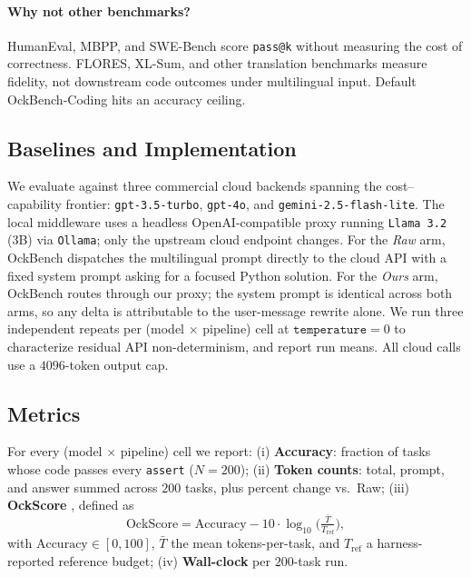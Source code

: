 \documentclass[11pt,a4paper,twocolumn]{article}
\begin{document}
\paragraph{Why not other benchmarks?} HumanEval, MBPP, and SWE-Bench \cite{jimenez2024swebench} score \texttt{pass@k} without measuring the cost of correctness. FLORES, XL-Sum, and other translation benchmarks measure fidelity, not downstream code outcomes under multilingual input. Default OckBench-Coding \cite{du2026ockbench} hits an accuracy ceiling.

\subsection{Baselines and Implementation}
We evaluate against three commercial cloud backends spanning the cost--capability frontier: \texttt{gpt-3.5-turbo}, \texttt{gpt-4o}, and \texttt{gemini-2.5-flash-lite}. The local middleware uses a headless OpenAI-compatible proxy running \texttt{Llama 3.2} (3B) via \texttt{Ollama}; only the upstream cloud endpoint changes. For the \textit{Raw} arm, OckBench dispatches the multilingual prompt directly to the cloud API with a fixed system prompt asking for a focused Python solution. For the \textit{Ours} arm, OckBench routes through our proxy; the system prompt is identical across both arms, so any delta is attributable to the user-message rewrite alone. We run three independent repeats per (model $\times$ pipeline) cell at $\texttt{temperature}=0$ to characterize residual API non-determinism, and report run means. All cloud calls use a $4096$-token output cap.

\subsection{Metrics}
\label{sec:metrics}
For every (model $\times$ pipeline) cell we report: (i) \textbf{Accuracy}: fraction of tasks whose code passes every \texttt{assert} ($N=200$); (ii) \textbf{Token counts}: total, prompt, and answer summed across $200$ tasks, plus percent change vs.\ Raw; (iii) \textbf{OckScore} \cite{du2026ockbench}, defined as
\begin{equation}
    \mathrm{OckScore} = \mathrm{Accuracy} - 10\cdot\log_{10}\!\Big(\tfrac{\bar{T}}{T_{\text{ref}}}\Big),
    \label{eq:ockscore}
\end{equation}
with $\mathrm{Accuracy}\in[0,100]$, $\bar{T}$ the mean tokens-per-task, and $T_{\text{ref}}$ a harness-reported reference budget; (iv) \textbf{Wall-clock} per $200$-task run.
\end{document}
